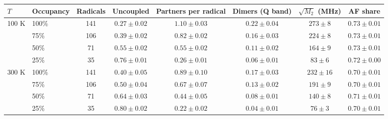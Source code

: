 \begin{tabular}{llcccccc}
\toprule
$T$ & Occupancy & Radicals & Uncoupled & Partners per radical & Dimers (Q band) & $\sqrt{M_2}$ (MHz) & AF share\\
\midrule
100 K & 100\% & 141 & $0.27\pm0.02$ & $1.10\pm0.03$ & $0.22\pm0.04$ & $273\pm8$ & $0.73\pm0.01$\\
 & 75\% & 106 & $0.39\pm0.02$ & $0.82\pm0.02$ & $0.16\pm0.03$ & $224\pm8$ & $0.73\pm0.01$\\
 & 50\% & 71 & $0.55\pm0.02$ & $0.55\pm0.02$ & $0.11\pm0.02$ & $164\pm9$ & $0.73\pm0.01$\\
 & 25\% & 35 & $0.76\pm0.01$ & $0.26\pm0.01$ & $0.06\pm0.01$ & $83\pm6$ & $0.72\pm0.00$\\
300 K & 100\% & 141 & $0.40\pm0.05$ & $0.89\pm0.10$ & $0.17\pm0.03$ & $232\pm16$ & $0.70\pm0.01$\\
 & 75\% & 106 & $0.50\pm0.04$ & $0.67\pm0.07$ & $0.13\pm0.02$ & $191\pm9$ & $0.70\pm0.01$\\
 & 50\% & 71 & $0.64\pm0.03$ & $0.44\pm0.05$ & $0.08\pm0.01$ & $140\pm8$ & $0.71\pm0.01$\\
 & 25\% & 35 & $0.80\pm0.02$ & $0.22\pm0.02$ & $0.04\pm0.01$ & $76\pm3$ & $0.70\pm0.01$\\
\bottomrule
\end{tabular}
